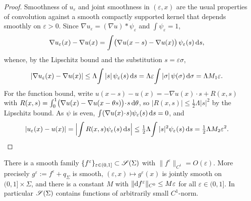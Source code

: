 \begin{proof}
Smoothness of $u_\varepsilon$ and joint smoothness in $(\varepsilon,x)$ are the
usual properties of convolution against a smooth compactly supported kernel that
depends smoothly on $\varepsilon>0$. Since $\nabla u_\varepsilon=(\nabla u)*\psi_\varepsilon$
and $\int\psi_\varepsilon=1$,
\[
\nabla u_\varepsilon(x)-\nabla u(x)
=\int\bigl(\nabla u(x-s)-\nabla u(x)\bigr)\,\psi_\varepsilon(s)\,\mathrm d s,
\]
whence, by the Lipschitz bound and the substitution $s=\varepsilon\sigma$,
\[
|\nabla u_\varepsilon(x)-\nabla u(x)|
\le\Lambda\!\int|s|\,\psi_\varepsilon(s)\,\mathrm d s
=\Lambda\varepsilon\!\int|\sigma|\,\psi(\sigma)\,\mathrm d\sigma=\Lambda M_1\varepsilon .
\]
For the function bound, write $u(x-s)-u(x)=-\nabla u(x)\!\cdot\! s+R(x,s)$ with
$R(x,s)=\int_0^1\bigl(\nabla u(x)-\nabla u(x-\theta s)\bigr)\!\cdot\! s\,\mathrm d\theta$,
so $|R(x,s)|\le\tfrac12\Lambda|s|^2$ by the Lipschitz bound. As $\psi$ is even,
$\int(\nabla u(x)\!\cdot\! s)\psi_\varepsilon(s)\,\mathrm d s=0$, and
\[
|u_\varepsilon(x)-u(x)|=\Bigl|\int R(x,s)\psi_\varepsilon(s)\,\mathrm d s\Bigr|
\le\tfrac12\Lambda\!\int|s|^2\psi_\varepsilon(s)\,\mathrm d s=\tfrac12\Lambda M_2\varepsilon^2 .
\qedhere
\]
\end{proof}

\begin{qeightlemma}\label{lem:small}
There is a smooth family $\{f^\varepsilon\}_{\varepsilon\in(0,1]}\subset\mathscr S(\Sigma)$
with $\|f^\varepsilon\|_{C^1}=O(\varepsilon)$. More precisely
$g^\varepsilon:=f^\varepsilon+q_\Sigma$ is smooth, $(\varepsilon,x)\mapsto
g^\varepsilon(x)$ is jointly smooth on $(0,1]\times\Sigma$, and there is a constant
$M$ with $\|\mathrm d f^\varepsilon\|_{C^0}\le M\varepsilon$ for all $\varepsilon\in(0,1]$.
In particular $\mathscr S(\Sigma)$ contains functions of arbitrarily small $C^1$-norm.
\end{qeightlemma}

